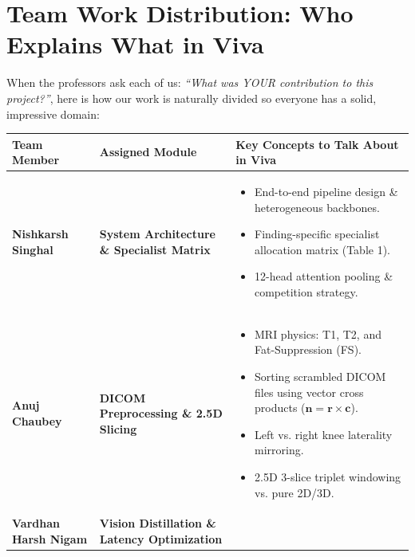 \documentclass[11pt,a4paper]{article}
\begin{document}
\vspace{0.1in}

\section{Team Work Distribution: Who Explains What in Viva}

When the professors ask each of us: \textit{“What was YOUR contribution to this project?”}, here is how our work is naturally divided so everyone has a solid, impressive domain:

\begin{table}[h!]
\centering
\small
\renewcommand{\arraystretch}{1.3}
\begin{tabularx}{\textwidth}{p{3.5cm} p{4.1cm} X}
\toprule
\textbf{Team Member} & \textbf{Assigned Module} & \textbf{Key Concepts to Talk About in Viva} \\
\midrule
\textbf{Nishkarsh Singhal} & \textbf{System Architecture \& Specialist Matrix} & 
\begin{itemize}[leftmargin=*,noitemsep,topsep=0pt]
    \item End-to-end pipeline design \& heterogeneous backbones.
    \item Finding-specific specialist allocation matrix (Table 1).
    \item 12-head attention pooling \& competition strategy.
\end{itemize} \\
\midrule
\textbf{Anuj Chaubey} & \textbf{DICOM Preprocessing \& 2.5D Slicing} & 
\begin{itemize}[leftmargin=*,noitemsep,topsep=0pt]
    \item MRI physics: T1, T2, and Fat-Suppression (FS).
    \item Sorting scrambled DICOM files using vector cross products ($\mathbf{n} = \mathbf{r} \times \mathbf{c}$).
    \item Left vs. right knee laterality mirroring.
    \item 2.5D 3-slice triplet windowing vs. pure 2D/3D.
\end{itemize} \\
\midrule
\textbf{Vardhan Harsh Nigam} & \textbf{Vision Distillation \& Latency Optimization} & 
\begin{itemize}[leftmargin=*,noitemsep,topsep=0pt]

\end{itemize}
\end{tabularx}
\end{table}
\end{document}
